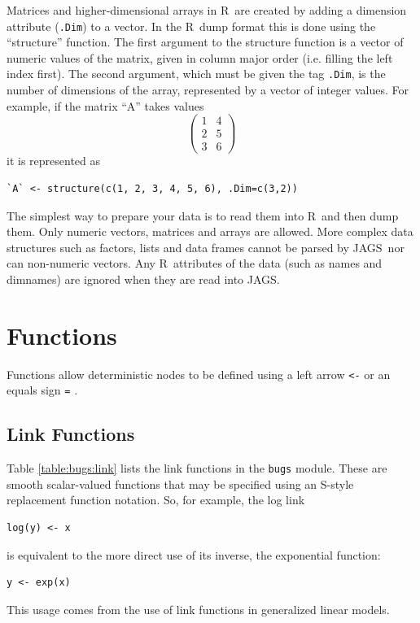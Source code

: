 \documentclass[11pt, a4paper, titlepage]{report}
\newcommand{\JAGS}{\textsf{JAGS}}
\newcommand{\R}{\textsf{R}}
\begin{document}
Matrices and higher-dimensional arrays in \R\ are created by adding a
dimension attribute (\verb+.Dim+) to a vector. In the \R\ dump format
this is done using the ``structure'' function.  The first argument to
the structure function is a vector of numeric values of the matrix,
given in column major order (i.e. filling the left index first). The
second argument, which must be given the tag \verb+.Dim+, is the
number of dimensions of the array, represented by a vector of integer
values. For example, if the matrix ``A'' takes values
\[
\left(
\begin{array}{cc}
  1 & 4 \\
  2 & 5 \\
  3 & 6 
\end{array}
\right)
\]
it is represented as
\begin{verbatim}
`A` <- structure(c(1, 2, 3, 4, 5, 6), .Dim=c(3,2))
\end{verbatim}

The simplest way to prepare your data is to read them into \R\ and
then dump them.  Only numeric vectors, matrices and arrays are
allowed. More complex data structures such as factors, lists and data
frames cannot be parsed by \JAGS\, nor can non-numeric vectors.  Any
\R\ attributes of the data (such as names and dimnames) are ignored
when they are read into \JAGS. 


\chapter{Functions}
\label{section:functions}

Functions allow deterministic nodes to be defined using a left arrow
\verb+<-+ or an equals sign \verb+=+ .

\section{Link Functions}

Table \ref{table:bugs:link} lists the link functions in the
\texttt{bugs} module.  These are smooth scalar-valued functions that
may be specified using an S-style replacement function notation. So,
for example, the log link
\begin{verbatim}
log(y) <- x
\end{verbatim}
is equivalent to the more direct use of its inverse, the exponential
function:
\begin{verbatim}
y <- exp(x)
\end{verbatim}
This usage comes from the use of link functions in generalized linear
models.
\end{document}
